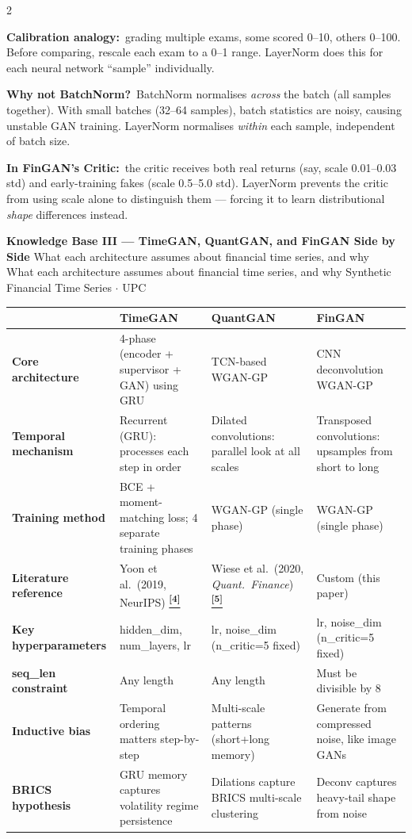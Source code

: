 \documentclass[10pt]{article}
\newcommand{\pagehead}[2]{%
  \begin{tcolorbox}[enhanced,arc=0pt,outer arc=0pt,boxrule=0pt,
    colback=Navy,colframe=Navy,
    top=5pt,bottom=5pt,left=8pt,right=8pt,
    before skip=0pt,after skip=10pt]
  {\color{white}\large\bfseries #1}%
  \ifx\relax#2\relax\else\\[1pt]{\color{blue!30!white}\small #2}\fi
  \hfill{\color{blue!20!white}\footnotesize Synthetic Financial Time Series $\cdot$ UPC}
  \end{tcolorbox}}
\newcommand{\tcite}[1]{%
  \hyperlink{R:#1}{\textsuperscript{\scriptsize\textbf{[#1]}}}}
\begin{document}
\begin{multicols}{2}
{\smallskip
\textbf{Calibration analogy:}\ grading multiple exams, some scored 0--10, others 0--100. Before comparing, rescale each exam to a 0--1 range. LayerNorm does this for each neural network ``sample'' individually.

\smallskip
\textbf{Why not BatchNorm?}\ BatchNorm normalises \emph{across} the batch (all samples together). With small batches (32--64 samples), batch statistics are noisy, causing unstable GAN training. LayerNorm normalises \emph{within} each sample, independent of batch size.

\smallskip
\textbf{In FinGAN's Critic:}\ the critic receives both real returns (say, scale 0.01--0.03 std) and early-training fakes (scale 0.5--5.0 std). LayerNorm prevents the critic from using scale alone to distinguish them --- forcing it to learn distributional \emph{shape} differences instead.}

\end{multicols}

\clearpage

\pagehead{Knowledge Base III --- TimeGAN, QuantGAN, and FinGAN Side by Side}
         {What each architecture assumes about financial time series, and why}

\vspace{4pt}
{\small
\begin{tabularx}{\linewidth}{@{}lXXX@{}}
\toprule
 & \textbf{\textcolor{TGcol}{TimeGAN}} & \textbf{\textcolor{QGcol}{QuantGAN}} & \textbf{\textcolor{FGcol}{FinGAN}} \\
\midrule
\textbf{Core architecture} & 4-phase (encoder + supervisor + GAN) using GRU & TCN-based WGAN-GP & CNN deconvolution WGAN-GP \\
\textbf{Temporal mechanism} & Recurrent (GRU): processes each step in order & Dilated convolutions: parallel look at all scales & Transposed convolutions: upsamples from short to long \\
\textbf{Training method} & BCE + moment-matching loss; 4 separate training phases & WGAN-GP (single phase) & WGAN-GP (single phase) \\
\textbf{Literature reference} & Yoon et al.\ (2019, NeurIPS)\tcite{4} & Wiese et al.\ (2020, \textit{Quant.\ Finance})\tcite{5} & Custom (this paper) \\
\textbf{Key hyperparameters} & hidden\_dim, num\_layers, lr & lr, noise\_dim (n\_critic=5 fixed) & lr, noise\_dim (n\_critic=5 fixed) \\
\textbf{seq\_len constraint} & Any length & Any length & Must be divisible by 8 \\
\textbf{Inductive bias} & Temporal ordering matters step-by-step & Multi-scale patterns (short+long memory) & Generate from compressed noise, like image GANs \\
\textbf{BRICS hypothesis} & GRU memory captures volatility regime persistence & Dilations capture BRICS multi-scale clustering & Deconv captures heavy-tail shape from noise \\
\bottomrule
\end{tabularx}}
\end{document}
